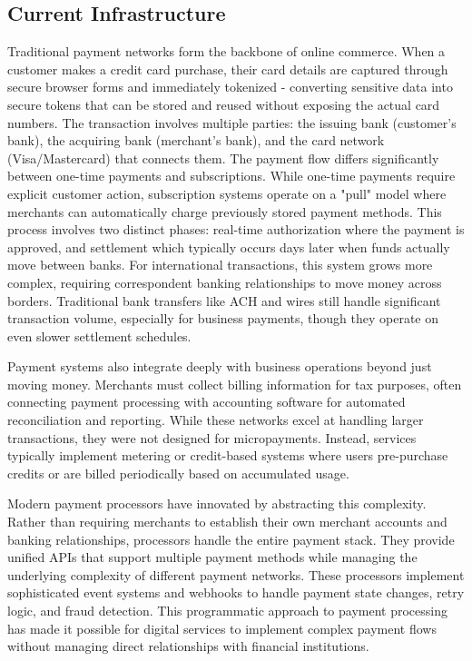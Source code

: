 \documentclass{article}
\begin{document}
\subsection{Current Infrastructure}
\label{subsec:payments_current}
Traditional payment networks form the backbone of online commerce. When a customer makes a credit card purchase, their card details are captured through secure browser forms and immediately tokenized - converting sensitive data into secure tokens that can be stored and reused without exposing the actual card numbers. The transaction involves multiple parties: the issuing bank (customer's bank), the acquiring bank (merchant's bank), and the card network (Visa/Mastercard) that connects them. The payment flow differs significantly between one-time payments and subscriptions. While one-time payments require explicit customer action, subscription systems operate on a "pull" model where merchants can automatically charge previously stored payment methods. This process involves two distinct phases: real-time authorization where the payment is approved, and settlement which typically occurs days later when funds actually move between banks. For international transactions, this system grows more complex, requiring correspondent banking relationships to move money across borders. Traditional bank transfers like ACH and wires still handle significant transaction volume, especially for business payments, though they operate on even slower settlement schedules.

Payment systems also integrate deeply with business operations beyond just moving money. Merchants must collect billing information for tax purposes, often connecting payment processing with accounting software for automated reconciliation and reporting. While these networks excel at handling larger transactions, they were not designed for micropayments. Instead, services typically implement metering or credit-based systems where users pre-purchase credits or are billed periodically based on accumulated usage.

Modern payment processors have innovated by abstracting this complexity. Rather than requiring merchants to establish their own merchant accounts and banking relationships, processors handle the entire payment stack. They provide unified APIs that support multiple payment methods while managing the underlying complexity of different payment networks. These processors implement sophisticated event systems and webhooks to handle payment state changes, retry logic, and fraud detection. This programmatic approach to payment processing has made it possible for digital services to implement complex payment flows without managing direct relationships with financial institutions.
\end{document}
